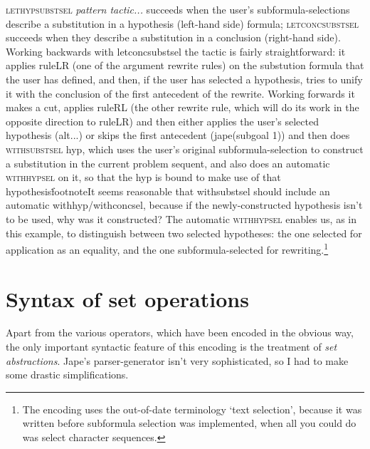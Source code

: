 \textsc{lethypsubstsel} \textit{pattern tactic...} succeeds when the user's subformula-selections describe a substitution in a hypothesis (left-hand side) formula; \textsc{letconcsubstsel} succeeds when they describe a substitution in a conclusion (right-hand side). Working backwards with letconcsubstsel the tactic is fairly straightforward: it applies ruleLR (one of the argument rewrite rules) on the substution formula that the user has defined, and then, if the user has selected a hypothesis, tries to unify it with the conclusion of the first antecedent of the rewrite. Working forwards it makes a cut, applies ruleRL (the other rewrite rule, which will do its work in the opposite direction to ruleLR) and then either applies the user's selected hypothesis (alt...) or skips the first antecedent (jape(subgoal 1)) and then does \textsc{withsubstsel} hyp, which uses the user's original subformula-selection to construct a substitution in the current problem sequent, and also does an automatic \textsc{withhypsel} on it, so that the hyp is bound to make use of that hypothesis\.footnote{It seems reasonable that withsubstsel should include an automatic withhyp/withconcsel, because if the newly-constructed hypothesis isn't to be used, why was it constructed?} The automatic \textsc{withhypsel} enables us, as in this example, to distinguish between two selected hypotheses: the one selected for application as an equality, and the one subformula-selected for rewriting.\footnote{The encoding uses the out-of-date terminology `text selection', because it was written before subformula selection was implemented, when all you could do was select character sequences.}

\section{Syntax of set operations}

Apart from the various operators, which have been encoded in the obvious way, the only important syntactic feature of this encoding is the treatment of \emph{set abstractions}. Jape's parser-generator isn't very sophisticated, so I had to make some drastic simplifications.


